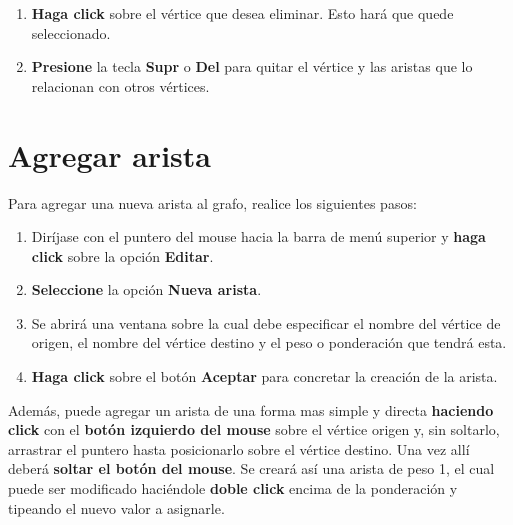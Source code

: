\documentclass{book}
\begin{document}
\begin{enumerate}
	\itemsep=8pt \topsep=0pt \partopsep=0pt \parskip=0pt \parsep=0pt

	\item \textbf{Haga click} sobre el vértice que desea eliminar. Esto hará que quede seleccionado.

	\item \textbf{Presione} la tecla \textbf{Supr} o \textbf{Del} para quitar el vértice y las aristas que lo relacionan con otros vértices.

\end{enumerate}
\medskip



\section{Agregar arista}

Para agregar una nueva arista al grafo, realice los siguientes pasos:
\medskip

\begin{enumerate}
	\itemsep=8pt \topsep=0pt \partopsep=0pt \parskip=0pt \parsep=0pt

	\item Diríjase con el puntero del mouse hacia la barra de menú superior y \textbf{haga click} sobre la opción \textbf{Editar}.

	\item \textbf{Seleccione} la opción \textbf{Nueva arista}.

	\item Se abrirá una ventana sobre la cual debe especificar el nombre del vértice de origen, el nombre del vértice destino y el peso o ponderación que tendrá esta.

	\item \textbf{Haga click} sobre el botón \textbf{Aceptar} para concretar la creación de la arista.

\end{enumerate}
\medskip

Además, puede agregar un arista de una forma mas simple y directa \textbf{haciendo click} con el \textbf{botón izquierdo del mouse} sobre el vértice origen y, sin soltarlo, arrastrar el puntero hasta posicionarlo sobre el vértice destino. Una vez allí deberá \textbf{soltar el botón del mouse}. Se creará así una arista de peso 1, el cual puede ser modificado haciéndole \textbf{doble click} encima de la ponderación y tipeando el nuevo valor a asignarle.
\medskip
\end{document}
